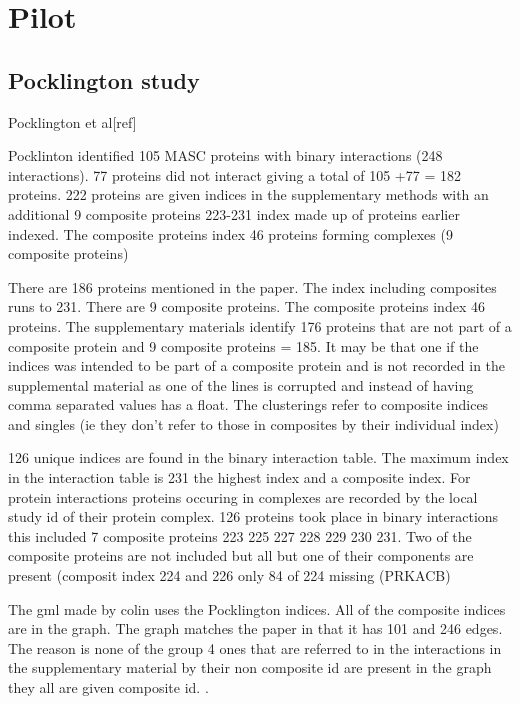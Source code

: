 \chapter{Pilot}
\section{Pocklington study}
Pocklington et al[ref]

Pocklinton identified 105 MASC proteins with binary interactions (248 interactions). 77 proteins did not interact giving a total of 105 +77 = 182 proteins. 222 proteins are given indices in the supplementary methods with an additional 9 composite proteins 223-231 index made up of proteins earlier indexed. The composite proteins index 46 proteins forming complexes (9 composite proteins)

There are 186 proteins mentioned in the paper. The index including composites runs to 231. There are 9 composite proteins. The composite proteins index 46 proteins. The supplementary materials identify 176 proteins that are not part of a composite protein and 9 composite proteins = 185. It may be that one if the indices was intended to be part of a composite protein and is not recorded in the supplemental material as one of the lines is corrupted and instead of having comma separated values has a float. The clusterings refer to composite indices and singles (ie they don't refer to those in composites by their individual index) 

126 unique indices are found in the binary interaction table. The maximum index in the interaction table is 231 the highest index and a composite index. For protein interactions proteins occuring in complexes are recorded by the local study id of their protein complex. 126 proteins took place in binary interactions this included 7 composite proteins 223 225 227 228 229 230   231. Two of the composite proteins are not included but all but one of their components are present (composit index 224 and 226 only 84 of 224 missing (PRKACB) 

The gml made by colin uses the Pocklington indices. All of the composite indices are in the graph. The graph matches the paper in that it has 101 and 246 edges. The reason is none of the group 4 ones that are referred to in the interactions in the supplementary material by their non composite id are present in the graph they all are given composite id. .  


